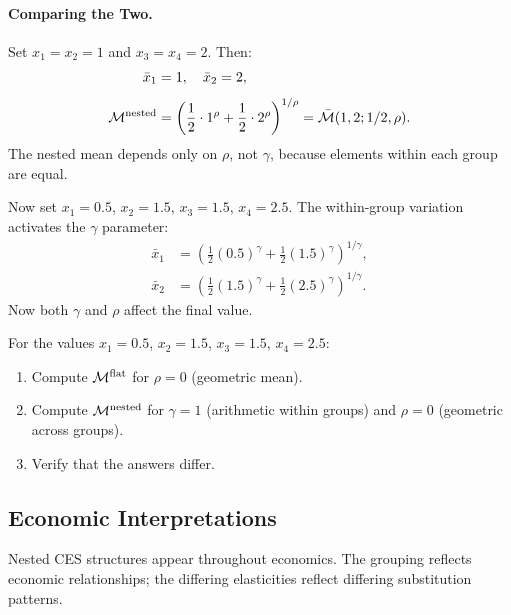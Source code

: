 \paragraph{Comparing the Two.}
Set $x_1 = x_2 = 1$ and $x_3 = x_4 = 2$. Then:
\begin{align}
\bar{x}_1 &= 1, \quad \bar{x}_2 = 2, \\[4pt]
\mathcal{M}^{\text{nested}} &= \left( \frac{1}{2} \cdot 1^\rho + \frac{1}{2} \cdot 2^\rho \right)^{1/\rho} = \bar{\mathcal{M}}(1, 2; 1/2, \rho).
\end{align}
The nested mean depends only on $\rho$, not $\gamma$, because elements within each group are equal.

Now set $x_1 = 0.5$, $x_2 = 1.5$, $x_3 = 1.5$, $x_4 = 2.5$. The within-group variation activates the $\gamma$ parameter:
\begin{align}
\bar{x}_1 &= \left( \frac{1}{2} (0.5)^\gamma + \frac{1}{2} (1.5)^\gamma \right)^{1/\gamma}, \\[4pt]
\bar{x}_2 &= \left( \frac{1}{2} (1.5)^\gamma + \frac{1}{2} (2.5)^\gamma \right)^{1/\gamma}.
\end{align}
Now both $\gamma$ and $\rho$ affect the final value.

\begin{callouttip}[Exercise]
For the values $x_1 = 0.5$, $x_2 = 1.5$, $x_3 = 1.5$, $x_4 = 2.5$:
\begin{enumerate}[label=(\alph*), leftmargin=1.5em]
    \item Compute $\mathcal{M}^{\text{flat}}$ for $\rho = 0$ (geometric mean).
    \item Compute $\mathcal{M}^{\text{nested}}$ for $\gamma = 1$ (arithmetic within groups) and $\rho = 0$ (geometric across groups).
    \item Verify that the answers differ.
\end{enumerate}
\end{callouttip}

\subsection{Economic Interpretations}
\label{subsec:economic-interpretations}

Nested CES structures appear throughout economics. The grouping reflects economic relationships; the differing elasticities reflect differing substitution patterns.

